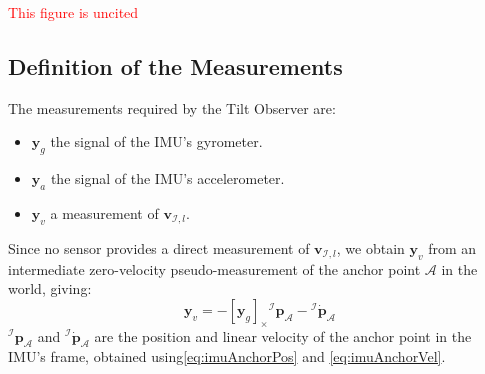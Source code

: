 \documentclass{IJCAS}
\begin{document}
\textcolor{red}{This figure is uncited}

\subsection{Definition of the Measurements} \label{subsec:tiltMeas}
The measurements required by the Tilt Observer are:
\begin{itemize}
    \item $\boldsymbol{y}_{g}$ the signal of the IMU's gyrometer.
    \item $\boldsymbol{y}_{a}$ the signal of the IMU's accelerometer.
    \item $\boldsymbol{y}_{v}$ a measurement of $\boldsymbol{v}_{\mathcal{I}, l}$.
\end{itemize}
Since no sensor provides a direct measurement of $\boldsymbol{v}_{\mathcal{I}, l}$, we obtain $\boldsymbol{y}_{v}$ from an intermediate zero-velocity pseudo-measurement of the anchor point $\mathcal{A}$ in the world, giving:
\begin{equation}
    \boldsymbol{y}_v = - \left[\boldsymbol{y}_{g}\right]_{\times} {^{\mathcal{I}}}\boldsymbol{p}_{\mathcal{A}} - {^{\mathcal{I}}} \dot{\boldsymbol{p}}_{\mathcal{A}} \label{eq:yv}
\end{equation}
${^{\mathcal{I}}}\boldsymbol{p}_{\mathcal{A}}$ and ${^{\mathcal{I}}} \dot{\boldsymbol{p}}_{\mathcal{A}}$ are the position and linear velocity of the anchor point in the IMU's frame, obtained using\eqref{eq:imuAnchorPos} and \eqref{eq:imuAnchorVel}.
\end{document}
